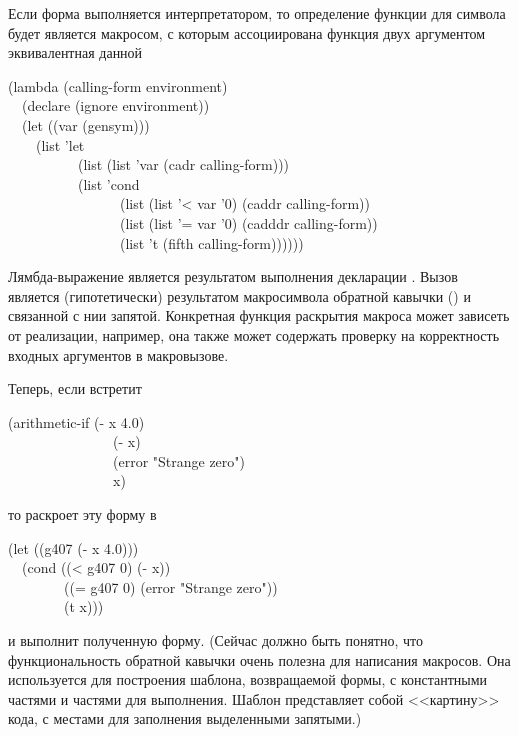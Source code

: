 \begin{defmac}
Если форма выполняется интерпретатором, то определение функции для символа
 будет является макросом, с которым ассоциирована функция двух
аргументом эквивалентная данной
\begin{lisp}
(lambda (calling-form environment) \\
~~(declare (ignore environment)) \\
~~(let ((var (gensym))) \\
~~~~(list 'let \\
~~~~~~~~~~(list (list 'var (cadr calling-form))) \\
~~~~~~~~~~(list 'cond \\
~~~~~~~~~~~~~~~~(list (list '< var '0) (caddr calling-form)) \\
~~~~~~~~~~~~~~~~(list (list '= var '0) (cadddr calling-form)) \\
~~~~~~~~~~~~~~~~(list 't (fifth calling-form))))))
\end{lisp}
Лямбда-выражение является результатом выполнения декларации .
Вызов  является (гипотетически) результатом макросимвола обратной
кавычки (\cd{{\Xbq}}) и связанной с нии запятой.
Конкретная функция раскрытия макроса может зависеть от реализации, например, она
также может содержать проверку на корректность входных аргументов в макровызове.

Теперь, если  встретит
\begin{lisp}
(arithmetic-if (- x 4.0) \\
~~~~~~~~~~~~~~~(- x) \\
~~~~~~~~~~~~~~~(error "Strange zero") \\
~~~~~~~~~~~~~~~x)
\end{lisp}
то раскроет эту форму в
\begin{lisp}
(let ((g407 (- x 4.0))) \\
~~(cond ((< g407 0) (- x)) \\
~~~~~~~~((= g407 0) (error "Strange zero")) \\
~~~~~~~~(t x)))
\end{lisp}
и  выполнит полученную форму.
(Сейчас должно быть понятно, что функциональность обратной кавычки очень полезна
для написания макросов. Она используется для построения шаблона, возвращаемой
формы, с константными частями и частями для выполнения. Шаблон представляет
собой <<картину>> кода, с местами для заполнения выделенными запятыми.)


\end{defmac}
